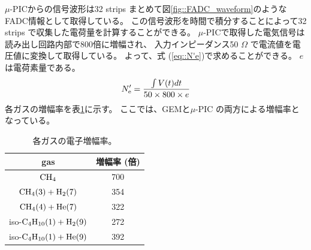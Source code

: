 $\mu$-PICからの信号波形は32 strips まとめて図\ref{fig::FADC_waveform}のようなFADC情報として取得している。
この信号波形を時間で積分することによって32 strips で収集した電荷量を計算することができる。
$\mu$-PICで取得した電気信号は読み出し回路内部で800倍に増幅され、
入力インピーダンス50 $\Omega$ で電流値を電圧値に変換して取得している。
よって、式 (\ref{eq::N'e})で求めることができる。
$e$は電荷素量である。
\begin{equation}
  N'_{\rm e} = \frac{\int V (t) dt}{ 50 \times 800 \times e}
  \label{eq::N'e}
\end{equation}
各ガスの増幅率を表\ref{tab::multiplying_rate}に示す。
ここでは、GEMと$\mu$-PIC の両方による増幅率となっている。
\begin{table}
  \centering
  \caption{各ガスの電子増幅率。}
  \label{tab::multiplying_rate}
  \begin{tabular}{cc}
    \toprule
    gas & 増幅率 (倍) \\
    \midrule
    ${\rm CH_{4}}$                          & 700 \\
    ${\rm CH_{4} (3) + H_{2} (7)}$          & 354 \\
    ${\rm CH_{4} (4) + He (7)}$             & 322 \\
    iso-${\rm C_{4}H_{10} (1) + H_{2} (9)}$ & 272 \\
    iso-${\rm C_{4}H_{10} (1) + He (9)}$    & 392 \\
    \bottomrule
  \end{tabular}
\end{table}

